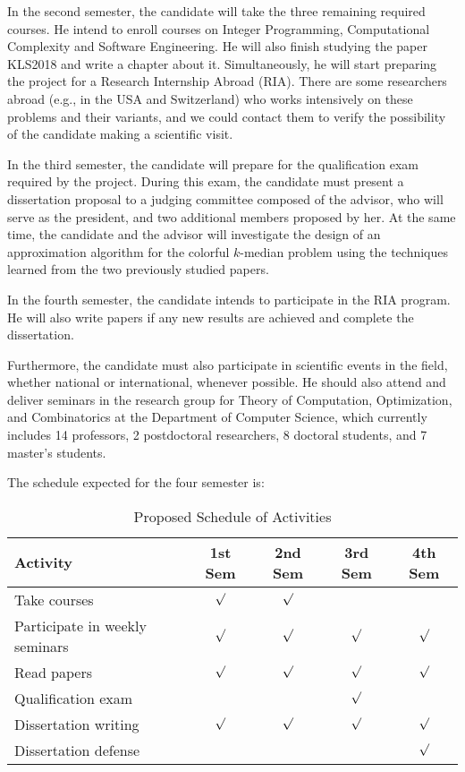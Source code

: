\documentclass[12pt]{article}
\begin{document}
In the second semester, the candidate will take the three remaining required courses.
He intend to enroll courses on Integer Programming, Computational Complexity and Software Engineering. 
He will also finish studying the paper KLS2018 and write a chapter about it.
Simultaneously, he will start preparing the project for a Research Internship Abroad (RIA). 
There are some researchers abroad (e.g., in the USA and Switzerland) who works intensively on these problems and their variants, and we could contact them to verify the possibility of the candidate making a scientific visit.

In the third semester, the candidate will prepare for the qualification exam required by the project. 
During this exam, the candidate must present a dissertation proposal to a judging committee composed of the advisor, who will serve as the president, and two additional members proposed by her.
At the same time, the candidate and the advisor will investigate the design of an approximation algorithm for the colorful $k$-median problem using the techniques learned from the two previously studied papers.

In the fourth semester, the candidate intends to participate in the RIA program.
He will also write papers if any new results are achieved and complete the dissertation.

Furthermore, the candidate must also participate in scientific events in the field, whether national or international, whenever possible. He should also attend and deliver seminars in the research group for Theory of Computation, Optimization, and Combinatorics at the Department of Computer Science, which currently includes 14 professors, 2 postdoctoral researchers, 8 doctoral students, and 7 master's students.

The schedule expected for the four semester is:

\begin{table}[ht]
\centering
\begin{tabular}{|l|c|c|c|c|}
\hline
\textbf{Activity} & \textbf{1st Sem} & \textbf{2nd Sem} & \textbf{3rd Sem} & \textbf{4th Sem} \\
\hline
Take courses                  & \(\surd\) & \(\surd\) &        &        \\
Participate in weekly seminars & \(\surd\) & \(\surd\) & \(\surd\) & \(\surd\) \\
Read papers           & \(\surd\) & \(\surd\) & \(\surd\) &   \(\surd\)     \\
Qualification exam            &          &          & \(\surd\) &        \\
Dissertation writing          &   \(\surd\)       &    \(\surd\)      & \(\surd\) & \(\surd\) \\
Dissertation defense          &          &          &          & \(\surd\) \\
\hline
\end{tabular}
\caption{Proposed Schedule of Activities}
\end{table}
\end{document}
